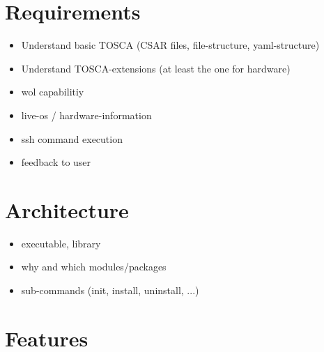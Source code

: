 \section{Requirements}
\begin{itemize}
  \item Understand basic TOSCA (CSAR files, file-structure, yaml-structure)
  \item Understand TOSCA-extensions (at least the one for hardware)
  \item wol capabilitiy
  \item live-os / hardware-information
  \item ssh command execution
  \item feedback to user
\end{itemize}

\section{Architecture}
\begin{itemize}
  \item executable, library
  \item why and which modules/packages
  \item sub-commands (init, install, uninstall, ...)
\end{itemize}

\section{Features}

